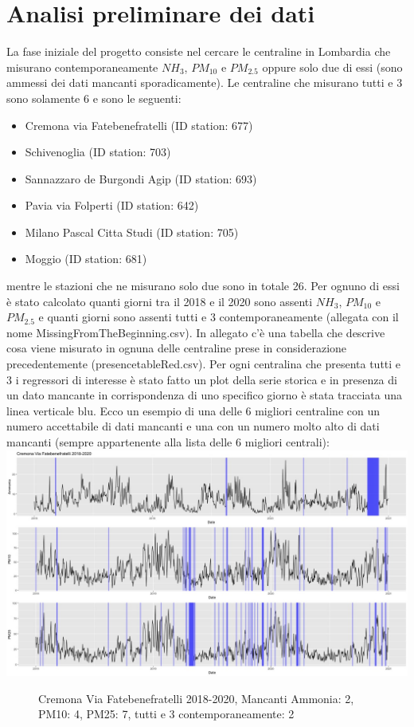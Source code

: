 \documentclass{article}
\begin{document}
\section{Analisi preliminare dei dati}
La fase iniziale del progetto consiste nel cercare le centraline in Lombardia
che misurano contemporaneamente $NH_{3}$, $PM_{10}$ e $PM_{2.5}$ oppure solo due di essi
(sono ammessi dei dati mancanti sporadicamente).
Le centraline che misurano tutti e 3 sono solamente 6 e sono le seguenti:
\begin{itemize}
    \item Cremona via Fatebenefratelli (ID station: 677)
    \item Schivenoglia (ID station: 703)
    \item Sannazzaro de Burgondi Agip (ID station: 693)
    \item Pavia via Folperti (ID station: 642)
    \item Milano Pascal Citta Studi (ID station: 705)
    \item Moggio (ID station: 681)
\end{itemize}
mentre le stazioni che ne misurano solo due sono in totale 26.
Per ognuno di essi è stato calcolato quanti giorni tra il 2018 e il 2020 sono assenti
$NH_{3}$, $PM_{10}$ e $PM_{2.5}$ e quanti giorni sono assenti tutti e 3 contemporaneamente
(allegata con il nome MissingFromTheBeginning.csv).
In allegato c'è una tabella che descrive cosa viene misurato in ognuna
delle centraline prese in considerazione precedentemente (presencetableRed.csv).
Per ogni centralina che presenta tutti e 3 i regressori di interesse è stato fatto
un plot della serie storica e in presenza di un dato mancante in corrispondenza
di uno specifico giorno è stata tracciata una linea verticale blu.
Ecco un esempio di una  delle 6 migliori centraline con un numero accettabile di dati mancanti e una con
un numero molto alto di dati mancanti (sempre appartenente alla lista delle 6 migliori centrali):
\includegraphics[scale=0.25]{Cremona Via Fatebenefratelli 2018-2020 .jpeg}
\begin{figure}[!h]
    \caption{Cremona Via Fatebenefratelli 2018-2020, Mancanti Ammonia: 2, PM10: 4, PM25: 7, tutti e 3 contemporaneamente: 2}
\end{figure}
\end{document}
